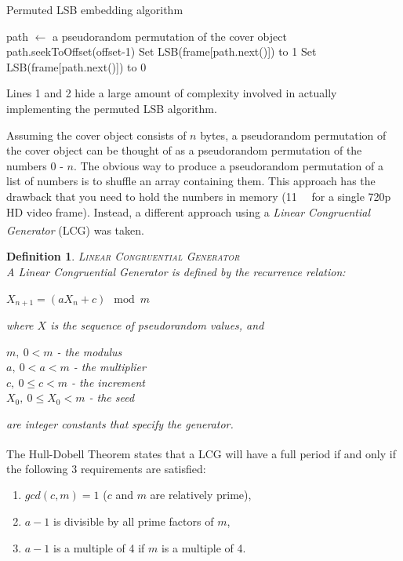 \documentclass[paper=a4, fontsize=11pt,twoside]{scrartcl}
\numberwithin{table}{section}
\numberwithin{figure}{section}
\numberwithin{algorithm}{section}
\newtheorem{ddef}{Definition}[section]
\begin{document}
\begin{algorithm}[!h]
\caption{Permuted LSB embedding algorithm}
\label{lsbp}
\begin{algorithmic}[1]
\State path $\gets$ a pseudorandom permutation of the cover object
\State path.seekToOffset(offset-1)
			\State Set LSB(frame[path.next()]) to 1
		\Else
			\State Set LSB(frame[path.next()]) to 0
		\EndIf
	\EndFor
\EndFor
\end{algorithmic}
\end{algorithm}

\noindent
Lines 1 and 2 hide a large amount of complexity involved in actually implementing the permuted LSB algorithm.

Assuming the cover object consists of $n$ bytes, a pseudorandom permutation of the cover object can be thought of as a pseudorandom permutation of the numbers 0 - $n$. The obvious way to produce a pseudorandom permutation of a list of numbers is to shuffle an array containing them. This approach has the drawback that you need to hold the numbers in memory (\SI{11}{\mega\byte} for a single 720p HD video frame). Instead, a different approach using a \textit{Linear Congruential Generator}\textsuperscript{\cite{lcg}} (LCG) was taken.

\begin{ddef}
\textsc{Linear Congruential Generator}\\[5pt]
A Linear Congruential Generator is defined by the recurrence relation:
\begin{center}
$X_{n+1} = (aX_{n} + c) \mod m$
\end{center}
where $X$ is the sequence of pseudorandom values, and
\begin{center}
$m, ~0 < m$ - the modulus\\
$a, ~0 < a < m$ - the multiplier\\
$c, ~0 \leq c < m$ - the increment\\
$X_{0}, ~0 \leq X_{0} < m$ - the seed
\end{center}
are integer constants that specify the generator.
\end{ddef}

\noindent
The Hull-Dobell Theorem\textsuperscript{\cite{hull}} states that a LCG will have a full period if and only if the following 3 requirements are satisfied:
\begin{enumerate}
	\item $gcd(c, m) = 1$ ($c$ and $m$ are relatively prime),
	\item $a-1$ is divisible by all prime factors of $m$,
	\item $a-1$ is a multiple of 4 if $m$ is a multiple of 4.
\end{enumerate}
\end{document}
